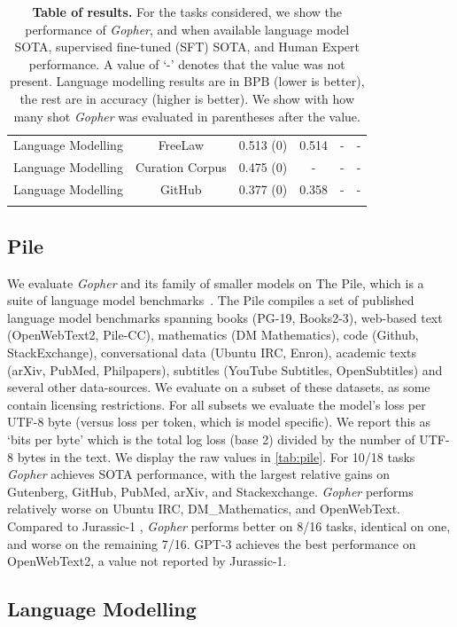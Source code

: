 \documentclass[11pt, a4paper, logo, internal, copyright, nonumbering]{deepmind}
\newcommand{\gopher}{\textit{Gopher}\xspace}
\begin{document}
\begin{center}
\begin{longtable}{cclccc}
Language Modelling & FreeLaw           &  0.513 (0) &  0.514 &  - & - \\
Language Modelling & Curation Corpus   &  0.475 (0) &  - &  - & - \\
Language Modelling & GitHub            &  0.377 (0) &  0.358 &  - & -  \\
\bottomrule
\caption{\textbf{Table of results.} For the tasks considered, we show the performance of \gopher, and when available language model SOTA, supervised fine-tuned  (SFT) SOTA, and Human Expert performance. A value of `-' denotes that the value was not present. Language modelling results are in BPB  (lower is better), the rest are in accuracy  (higher is better). We show with how many shot \gopher was evaluated in parentheses after the value.
}
\label{tab:all_results}
\end{longtable}
\end{center}

\subsection{Pile}
\label{sec:pile}
We evaluate \gopher and its family of smaller models on The Pile, which is a suite of language model benchmarks~\citep{pile}. The Pile compiles a set of published language model benchmarks spanning books (PG-19, Books2-3), web-based text (OpenWebText2, Pile-CC), mathematics (DM Mathematics), code (Github, StackExchange), conversational data (Ubuntu IRC, Enron), academic texts (arXiv, PubMed, Philpapers), subtitles (YouTube Subtitles, OpenSubtitles) and several other data-sources. We evaluate on a subset of these datasets, as some contain licensing restrictions. For all subsets we evaluate the model's loss per UTF-8 byte (versus loss per token, which is model specific). We report this as `bits per byte' which is the total log loss (base 2) divided by the number of UTF-8 bytes in the text.
We display the raw values in \autoref{tab:pile}.
For 10/18 tasks \gopher achieves SOTA performance, with the largest relative gains on Gutenberg, GitHub, PubMed, arXiv, and Stackexchange.
\gopher performs relatively worse on Ubuntu IRC, DM\_Mathematics, and OpenWebText. 
Compared to Jurassic-1 \citep{jurassic}, \gopher performs better on 8/16 tasks, identical on one, and worse on the remaining 7/16. GPT-3 achieves the best performance on OpenWebText2, a value not reported by Jurassic-1. 

\subsection{Language Modelling}
\label{sec:lm}
\end{document}
